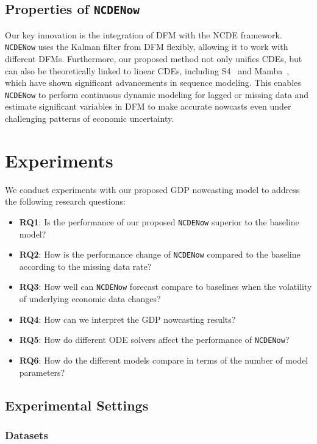 \documentclass[sigconf]{acmart}
\begin{document}
\subsection{Properties of \texttt{NCDENow}}
Our key innovation is the integration of DFM with the NCDE framework. \texttt{NCDENow} uses the Kalman filter from DFM flexibly, allowing it to work with different DFMs. Furthermore, our proposed method not only unifies CDEs, but can also be theoretically linked to linear CDEs, including S4~\cite{gu2021efficiently} and Mamba~\cite{gu2023mamba}, which have shown significant advancements in sequence modeling. This enables \texttt{NCDENow} to perform continuous dynamic modeling for lagged or missing data and estimate significant variables in DFM to make accurate nowcasts even under challenging patterns of economic uncertainty.


\section{Experiments} \label{sec:exp}
We conduct experiments with our proposed GDP nowcasting model to address the following research questions:

\begin{itemize}
\item \textbf{RQ1}: Is the performance of our proposed \texttt{NCDENow} superior to the baseline model?
\item \textbf{RQ2}: How is the performance change of \texttt{NCDENow} compared to the baseline according to the missing data rate?
\item \textbf{RQ3}: How well can \texttt{NCDENow} forecast compare to baselines when the volatility of underlying economic data changes?
\item \textbf{RQ4}: How can we interpret the GDP nowcasting results?
\item \textbf{RQ5}: How do different ODE solvers affect the performance of \texttt{NCDENow}?
\item \textbf{RQ6}: How do the different models compare in terms of the number of model parameters?
\end{itemize}


\subsection{Experimental Settings}
\subsubsection{Datasets}
\end{document}
